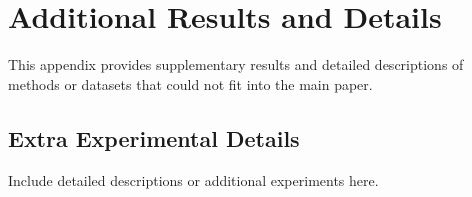 \section{Additional Results and Details}
This appendix provides supplementary results and detailed descriptions of methods or datasets that could not fit into the main paper.

\subsection{Extra Experimental Details}
Include detailed descriptions or additional experiments here.
